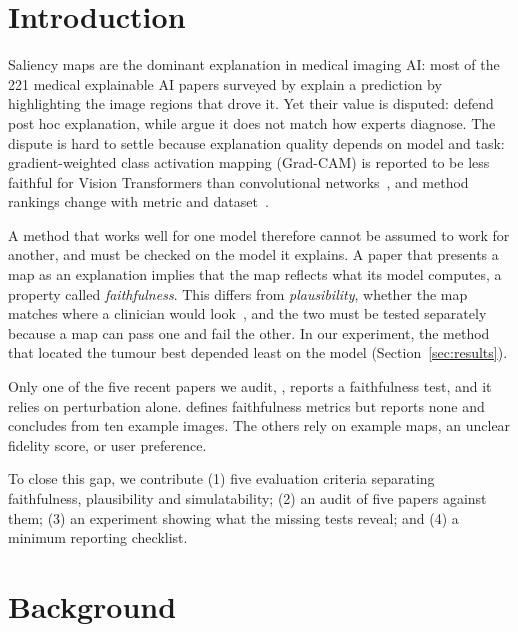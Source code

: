 \documentclass[conference]{IEEEtran}
\renewcommand{\cite}{\citep}
\begin{document}
\section{Introduction}
Saliency maps are the dominant explanation in medical imaging AI: most of the 
221 medical explainable AI papers surveyed by \citet{vandervelden2022xai} explain a 
prediction by highlighting the image regions that drove it. Yet their value is 
disputed: \citet{hatherley2026defence} defend post hoc explanation, while 
\citet{kaufman2023radiology} argue it does not match how experts diagnose. 
The dispute is hard to settle because explanation quality depends on model 
and task: gradient-weighted class activation mapping (Grad-CAM) is reported 
to be less faithful for Vision Transformers than convolutional networks~\cite{panboonyuen2026seeing}, 
and method rankings change with metric and dataset~\cite{ma2026ranking}.

A method that works well for one model therefore cannot be assumed to work 
for another, and must be checked on the model it explains. A paper that 
presents a map as an explanation implies that the map reflects what its 
model computes, a property called \emph{faithfulness}. This differs from 
\emph{plausibility}, whether the map matches where a clinician would 
look~\cite{jacovi2020faithfulness}, and the two must be tested separately 
because a map can pass one and fail the other. In our experiment, the method 
that located the tumour best depended least on the model 
(Section~\ref{sec:results}).

Only one of the five recent papers we audit, \citet{ma2026ranking}, reports 
a faithfulness test, and it relies on perturbation alone. 
\citet{panboonyuen2026seeing} defines faithfulness metrics but reports none 
and concludes from ten example images. The others rely on example maps, an 
unclear fidelity score, or user preference.

To close this gap, we contribute (1) five evaluation criteria separating faithfulness, 
plausibility and simulatability; (2) an audit of five papers against them; 
(3) an experiment showing what the missing tests reveal; and (4) a minimum 
reporting checklist.

\section{Background}
\label{sec:background}
 
\end{document}
